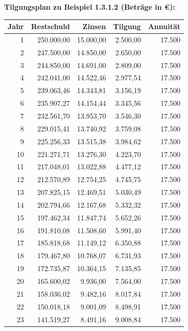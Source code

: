 \begin{center}
  \centering
  \textbf{Tilgungsplan zu Beispiel 1.3.1.2 (Beträge in €):}\par\medskip
  \begin{tabular}{rrrrr}
    \hline
    Jahr & Restschuld & Zinsen & Tilgung & Annuität\\
    \hline
    1 & 250.000{,}00 & 15.000{,}00 & 2.500{,}00 & 17.500\\
    2 & 247.500{,}00 & 14.850{,}00 & 2.650{,}00 & 17.500\\
    3 & 244.850{,}00 & 14.691{,}00 & 2.809{,}00 & 17.500\\
    4 & 242.041{,}00 & 14.522{,}46 & 2.977{,}54 & 17.500\\
    5 & 239.063{,}46 & 14.343{,}81 & 3.156{,}19 & 17.500\\
    6 & 235.907{,}27 & 14.154{,}44 & 3.345{,}56 & 17.500\\
    7 & 232.561{,}70 & 13.953{,}70 & 3.546{,}30 & 17.500\\
    8 & 229.015{,}41 & 13.740{,}92 & 3.759{,}08 & 17.500\\
    9 & 225.256{,}33 & 13.515{,}38 & 3.984{,}62 & 17.500\\
    10 & 221.271{,}71 & 13.276{,}30 & 4.223{,}70 & 17.500\\
    11 & 217.048{,}01 & 13.022{,}88 & 4.477{,}12 & 17.500\\
    12 & 212.570{,}89 & 12.754{,}25 & 4.745{,}75 & 17.500\\
    13 & 207.825{,}15 & 12.469{,}51 & 5.030{,}49 & 17.500\\
    14 & 202.794{,}66 & 12.167{,}68 & 5.332{,}32 & 17.500\\
    15 & 197.462{,}34 & 11.847{,}74 & 5.652{,}26 & 17.500\\
    16 & 191.810{,}08 & 11.508{,}60 & 5.991{,}40 & 17.500\\
    17 & 185.818{,}68 & 11.149{,}12 & 6.350{,}88 & 17.500\\
    18 & 179.467{,}80 & 10.768{,}07 & 6.731{,}93 & 17.500\\
    19 & 172.735{,}87 & 10.364{,}15 & 7.135{,}85 & 17.500\\
    20 & 165.600{,}02 & 9.936{,}00 & 7.564{,}00 & 17.500\\
    21 & 158.036{,}02 & 9.482{,}16 & 8.017{,}84 & 17.500\\
    22 & 150.018{,}18 & 9.001{,}09 & 8.498{,}91 & 17.500\\
    23 & 141.519{,}27 & 8.491{,}16 & 9.008{,}84 & 17.500\\

\end{tabular}
\end{center}
